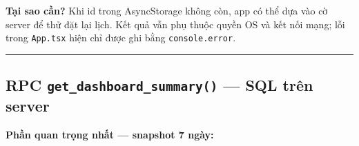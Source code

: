 \documentclass[12pt,a4paper]{article}
\newenvironment{Shaded}{%
  \VerbatimEnvironment
  \begin{quote}\small\ttfamily
}{%
  \end{quote}%
}
\begin{document}
\begin{Shaded}
\begin{Highlighting}[]
   \OperatorTok{:} \NormalTok{)}\OperatorTok{:} \OperatorTok{\textless{}}\OperatorTok{\textgreater{}}\NormalTok{ \{}
  \OperatorTok{;}

   \OperatorTok{;}   

  \OperatorTok{=}  \OperatorTok{;}
  \NormalTok{) \{}
    \OperatorTok{=}  \NormalTok{()}\OperatorTok{;}
     \NormalTok{)}\OperatorTok{;}
\NormalTok{  \}}
\NormalTok{\}}

\end{Highlighting}
\end{Shaded}

\textbf{Tại sao cần?} Khi id trong AsyncStorage không còn, app có thể
dựa vào cờ server để thử đặt lại lịch. Kết quả vẫn phụ thuộc quyền OS và
kết nối mạng; lỗi trong \texttt{App.tsx} hiện chỉ được ghi bằng
\texttt{console.error}.

\begin{center}\rule{0.5\linewidth}{0.5pt}\end{center}

\subsection{\texorpdfstring{RPC \texttt{get\_dashboard\_summary()} ---
SQL trên
server}{RPC get\_dashboard\_summary() --- SQL trên server}}\label{rpc-get_dashboard_summary-sql-truxean-server}

\textbf{Phần quan trọng nhất --- snapshot 7 ngày:}
\end{document}
